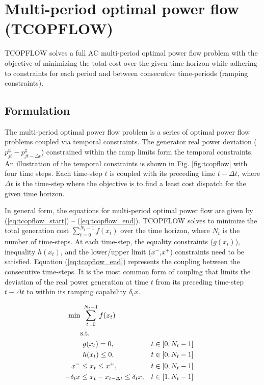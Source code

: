 \chapter{Multi-period optimal power flow (TCOPFLOW)}\label{chap:tcopflow}

TCOPFLOW solves a full AC multi-period optimal power flow problem with the objective of minimizing the total cost over the given time horizon while adhering to constraints for each period and between consecutive time-periods (ramping constraints). 

\section{Formulation}
The multi-period optimal power flow problem is a series of optimal power flow problems coupled via temporal constraints. The generator real power deviation ($p_{jt}^{\text{g}} - p_{jt-\Delta{t}}^{\text{g}}$) constrained within the ramp limits form the temporal constraints. An illustration of the temporal constraints is shown in Fig. \ref{fig:tcopflow} with four time steps. Each time-step $t$ is coupled with its preceding time $t-\Delta{t}$, where $\Delta{t}$ is the time-step where the objective is to find a least cost dispatch for the given time horizon.



In general form, the equations for multi-period optimal power flow are given by (\ref{eq:tcopflow_start}) -- (\ref{eq:tcopflow_end}). TCOPFLOW solves to minimize the total generation cost $\sum_{t=0}^{N_t-1}f(x_t)$ over the time horizon, where $N_t$ is the number of time-steps. At each time-step, the equality constraints ($g(x_t)$), inequality $h(x_t)$, and the lower/upper limit ($x^-$,$x^+$) constraints need to be satisfied. Equation (\ref{eq:tcopflow_end}) represents the coupling between the consecutive time-steps. It is the most common form of coupling that limits the deviation of the real power generation at time $t$ from its preceding time-step $t-\Delta{t}$ to within its ramping capability $\delta_t{x}$.


\begin{align}
\centering
\text{min}&~\sum_{t=0}^{N_t-1} f(x_t) &  \label{eq:tcopflow_start}\\
&\text{s.t.}& \nonumber \\
&~g(x_t) = 0,                                        &t \in \left[0,N_t-1\right]& \\
&~h(x_t) \le 0,                                      &t \in \left[0,N_t-1\right]& \\
x^- & \le x_t \le x^+,                               &t\in \left[0,N_t-1\right]& \\
-\delta_t{x} & \le x_t - x_{t-\Delta{t}} \le \delta_t{x},&t \in \left[1,N_t-1\right]&
\label{eq:tcopflow_end}
\end{align}

